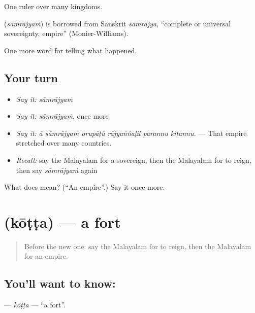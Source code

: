 One ruler over many kingdoms.

\begin{cousinweb}
\textbf{} (\emph{sāmrājyaṁ}) is borrowed from Sanskrit \emph{sāmrājya}, \textquotedblleft{}complete or universal sovereignty, empire\textquotedblright{} (Monier-Williams).
\end{cousinweb}

\begin{grammarlens}[title={What you've built}]
One more word for telling what happened.
\end{grammarlens}

\subsection*{Your turn}
\begin{itemize}
\raggedright
  \item \emph{Say it:} \emph{sāmrājyaṁ}
  \item \emph{Say it:} \emph{sāmrājyaṁ}, once more
  \item \emph{Say it:} \emph{ā sāmrājyaṁ orupāṭŭ rājyaṅṅaḷil parannu kiṭannu.} — That empire stretched over many countries.
  \item \emph{Recall:} say the Malayalam for a sovereign, then the Malayalam for to reign, then say \emph{sāmrājyaṁ} again
\end{itemize}

\begin{tcolorbox}[breakable,colback=teal!4,colframe=teal!35!black,title={Before you move on}]
What does  mean? (\textquotedblleft{}An empire\textquotedblright{}.) Say it once more.
\end{tcolorbox}
\section[\texorpdfstring{\ml{കോട്ട} (kōṭṭa)}{കോട്ട (kōṭṭa)}]{ (kōṭṭa) — a fort}

\label{lesson:ML-C399-kotta}



\begin{quote}
Before the new one: say the Malayalam for to reign, then the Malayalam for an empire.
\end{quote}

\subsection*{You'll want to know: }
\textbf{} — \emph{kōṭṭa} — \textquotedblleft{}a fort\textquotedblright{}.

